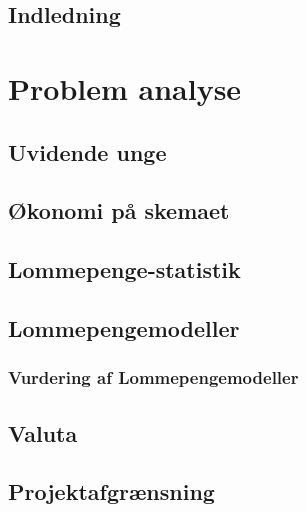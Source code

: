 





\tableofcontents


\section {Indledning}


\chapter{Problem analyse}

\section{Uvidende unge}
\label{UvidendeUnge}


\section{Økonomi på skemaet}
\label{Okonomi}


\section{Lommepenge-statistik}
\label{LommeStat}


\section{Lommepengemodeller}
\label{LommeModeller}

\subsection{Vurdering af Lommepengemodeller}
\label{ModelVurdering}


\section{Valuta}
\label{Valuta}


\section{Projektafgrænsning}


